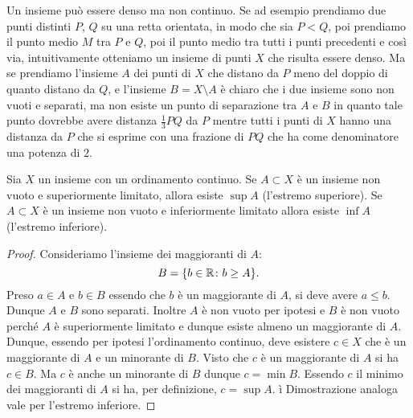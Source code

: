 \begin{example}
Un insieme può essere denso ma non continuo. 
Se ad esempio prendiamo due punti distinti $P$, $Q$ su una retta orientata, 
in modo che sia $P<Q$, poi prendiamo il punto 
medio $M$ tra $P$ e $Q$, poi il punto medio tra tutti i punti precedenti 
e così via,
intuitivamente otteniamo un insieme di punti $X$ che risulta essere denso.
Ma se prendiamo l'insieme $A$ dei punti di $X$ che distano da $P$ 
meno del doppio di quanto distano da $Q$, 
e l'insieme $B=X\setminus A$ è chiaro che i due insieme sono non vuoti e 
separati, ma non esiste un punto di separazione tra $A$ e $B$ in quanto 
tale punto dovrebbe avere distanza $\frac 1 3 PQ$ da $P$ mentre tutti i punti 
di $X$ hanno una distanza da $P$ che si esprime con una frazione di $PQ$ 
che ha come denominatore una potenza di $2$.
\end{example}


\begin{theorem}%
  \label{th:sup}%
  \mymark{**}%
  Sia $X$ un insieme con un ordinamento continuo.
  Se $A\subset X$ è un insieme non vuoto
  e superiormente limitato, allora esiste $\sup A$ (l'estremo superiore).
  Se $A\subset X$ è un insieme non vuoto e inferiormente limitato 
  allora esiste $\inf A$ (l'estremo inferiore).
  \end{theorem}
  \begin{proof}
  \mymark{*}
  Consideriamo l'insieme dei maggioranti di $A$:
  \[
  B = {\left\{  b\in {\mathbb R} \colon b \ge A \right\}}.
  \]
  Preso $a\in A$ e $b\in B$ essendo che $b$ è un maggiorante di $A$,
  si deve avere $a\le b$. Dunque $A$ e $B$ sono separati.
  Inoltre $A$ è non vuoto per ipotesi e $B$ è non vuoto perché 
  $A$ è superiormente limitato e dunque esiste almeno un maggiorante di $A$.
  Dunque, essendo per ipotesi l'ordinamento continuo,
  deve esistere $c\in X$ che è un maggiorante di $A$ e un minorante di $B$.
  Visto che $c$ è un maggiorante di $A$ si ha $c\in B$.
  Ma $c$ è anche un minorante di $B$ dunque $c=\min B$.
  Essendo $c$ il minimo dei maggioranti di $A$ si ha, per definizione,
  $c= \sup A$.
ì
  Dimostrazione analoga vale per l'estremo inferiore.
\end{proof}

